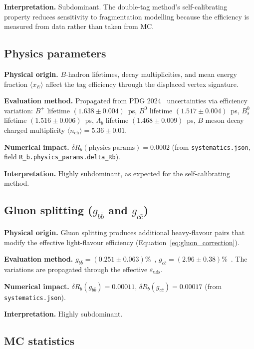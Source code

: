 \documentclass[11pt,a4paper]{article}
\begin{document}
\textbf{Interpretation.} Subdominant. The double-tag method's self-calibrating property
reduces sensitivity to fragmentation modelling because the efficiency is measured from
data rather than taken from MC.

\subsection{Physics parameters}
\label{sec:syst_physics}

\textbf{Physical origin.} $B$-hadron lifetimes, decay multiplicities, and mean energy
fraction $\langle x_E \rangle$ affect the tag efficiency through the displaced vertex
signature.

\textbf{Evaluation method.} Propagated from PDG 2024~\cite{PDG:2024} uncertainties
via efficiency variation:
$B^+$ lifetime $(1.638 \pm 0.004)$~ps,
$B^0$ lifetime $(1.517 \pm 0.004)$~ps,
$B_s^0$ lifetime $(1.516 \pm 0.006)$~ps,
$\Lambda_b$ lifetime $(1.468 \pm 0.009)$~ps,
$B$ meson decay charged multiplicity $\langle n_\mathrm{ch} \rangle = 5.36 \pm 0.01$.

\textbf{Numerical impact.}
$\delta R_b(\mathrm{physics\;params}) = 0.0002$
(from \texttt{systematics.json}, field \texttt{R\_b.physics\_params.delta\_Rb}).

\textbf{Interpretation.} Highly subdominant, as expected for the self-calibrating method.

\subsection{Gluon splitting ($g_{b\bar{b}}$ and $g_{c\bar{c}}$)}
\label{sec:syst_gluon}

\textbf{Physical origin.} Gluon splitting produces additional heavy-flavour pairs
that modify the effective light-flavour efficiency (Equation~\ref{eq:gluon_correction}).

\textbf{Evaluation method.}
$g_{b\bar{b}} = (0.251 \pm 0.063)\%$~\cite{LEP:HF:2001},
$g_{c\bar{c}} = (2.96 \pm 0.38)\%$~\cite{LEP:gcc}.
The variations are propagated through the effective $\varepsilon_\mathrm{uds}$.

\textbf{Numerical impact.}
$\delta R_b(g_{b\bar{b}}) = 0.00011$,
$\delta R_b(g_{c\bar{c}}) = 0.00017$
(from \texttt{systematics.json}).

\textbf{Interpretation.} Highly subdominant.

\subsection{MC statistics}
\label{sec:syst_mc_stat}
\end{document}
